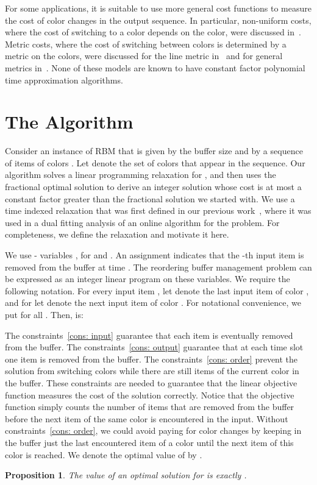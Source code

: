 \documentclass[11pt]{article}
\newtheorem{proposition}[theorem]{Proposition}
\begin{document}
For some applications, it is suitable to use more general cost functions to
measure the cost of color changes in the output sequence. In particular,
non-uniform costs, where the cost of switching to a color depends on
the color, were discussed in~\cite{EW05,AR10,ACER11}. Metric costs,
where the cost of switching between colors is determined by a metric on
the colors, were discussed for the line metric in~\cite{KP06,GS07} and for
general metrics in~\cite{ERW07}. None of these models are known to have
constant factor polynomial time approximation algorithms.



\section{The Algorithm}

Consider an instance  of RBM that is given by the buffer
size  and by a sequence of  items of colors .
Let  denote the set of colors that appear in the sequence.
Our algorithm solves a linear programming relaxation for ,
and then uses the fractional optimal solution to
derive an integer solution whose cost is at most a constant factor
greater than the fractional solution we started with. We use a time
indexed relaxation that was first defined in our previous work~\cite{AR10},
where it was used in a dual fitting analysis of an online algorithm for the
problem. For completeness, we define the relaxation and motivate it here.

We use - variables , for  and
.
An assignment  indicates that the -th input item is
removed from the buffer at time . The reordering buffer management
problem can be expressed as an integer linear program  on these
variables. We require the following notation. For every input item ,
let  denote the last input item of color , and for 
let  denote the next input item of color . For notational
convenience, we put  for all .
Then,  is:

The constraints~\eqref{cons: input} guarantee that each item is eventually
removed from the buffer. The constraints~\eqref{cons: output} guarantee
that at each time slot one item is removed from the buffer.
The constraints~\eqref{cons: order} prevent the solution from switching
colors while there are still items of the current color in the buffer. These
constraints are needed to guarantee that the linear objective function
measures the cost of the solution correctly. Notice that the objective function
simply counts the number of items that are removed from the buffer before
the next item of the same color is encountered in the input. Without
constraints~\eqref{cons: order}, we could avoid paying for color changes
by keeping in the buffer just the last encountered item of a color  until
the next item of this color is reached. We denote the optimal value of
 by .
\begin{proposition}\label{pr: IP = RBM}
The value of an optimal solution for  is exactly .
\end{proposition}
\end{document}
